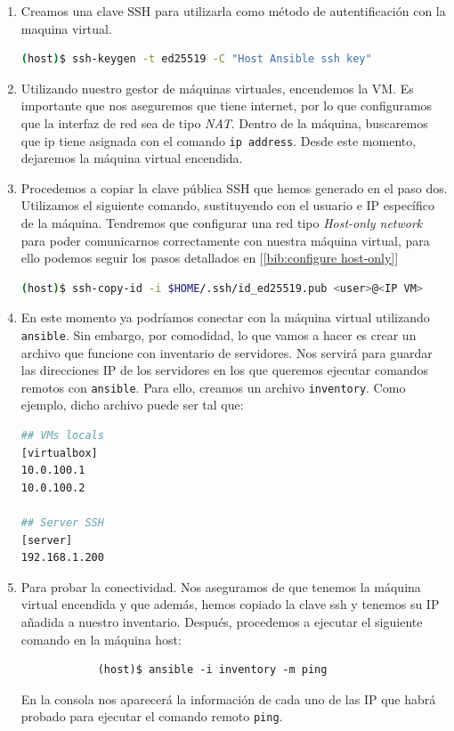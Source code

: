 \documentclass[12pt]{article}
\begin{document}
\begin{enumerate}
		\item Creamos una clave SSH para utilizarla como método de autentificación con la maquina virtual. 
		\begin{lstlisting}[language=Bash, caption={Crear clave SSH para autenticación en VM}]
(host)$ ssh-keygen -t ed25519 -C "Host Ansible ssh key"
		\end{lstlisting}
		
		\pagebreak
		
		\item Utilizando nuestro gestor de máquinas virtuales, encendemos la VM. Es importante que nos aseguremos que tiene internet, por lo que configuramos que la interfaz de red sea de tipo \textit{NAT}. Dentro de la máquina, buscaremos que ip tiene asignada con el comando \texttt{ip address}. Desde este momento, dejaremos la máquina virtual encendida.
		
		\item Procedemos a copiar la clave pública SSH que hemos generado en el paso dos. Utilizamos el siguiente comando, sustituyendo con el usuario e IP específico de la máquina. Tendremos que configurar una red tipo \textit{Host-only network} para poder comunicarnos correctamente con nuestra máquina virtual, para ello podemos seguir los pasos detallados en [\ref{bib:configure host-only}]
		\begin{lstlisting}[language=Bash, caption={Copiar clave pública de \texttt{ansible} a VM}]
(host)$ ssh-copy-id -i $HOME/.ssh/id_ed25519.pub <user>@<IP VM>
		\end{lstlisting}

		\item En este momento ya podríamos conectar con la máquina virtual utilizando \texttt{ansible}. Sin embargo, por comodidad, lo que vamos a hacer es crear un archivo que funcione con inventario de servidores. Nos servirá para guardar las direcciones IP de los servidores en los que queremos ejecutar comandos remotos con \texttt{ansible}. Para ello, creamos un archivo \texttt{inventory}. Como ejemplo, dicho archivo puede ser tal que:
		\begin{lstlisting}[language=Bash, caption={Contenido del archivo \texttt{inventory} de \texttt{ansible}}]
## VMs locals 
[virtualbox]
10.0.100.1
10.0.100.2
			
## Server SSH
[server]
192.168.1.200
		\end{lstlisting}
		
		\item Para probar la conectividad. Nos aseguramos de que tenemos la máquina virtual encendida y que además, hemos copiado la clave ssh y tenemos su IP añadida a nuestro inventario. Después, procedemos a ejecutar el siguiente comando en la máquina host:
		\begin{verbatim}
			(host)$ ansible -i inventory -m ping
		\end{verbatim}
		\noindent En la consola nos aparecerá la información de cada uno de las IP que habrá probado para ejecutar el comando remoto \texttt{ping}.
	\end{enumerate}
	
\end{document}
